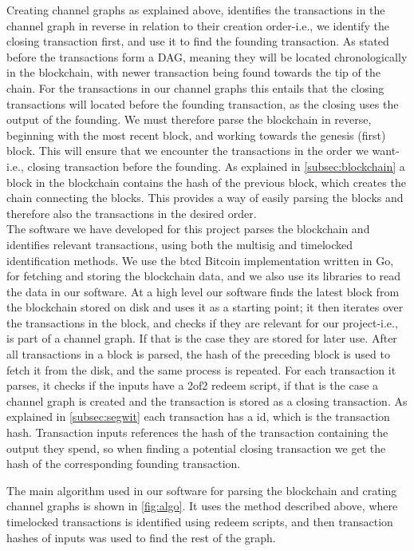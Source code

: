 Creating channel graphs as explained above, identifies the transactions in the channel graph in reverse in relation to their creation order-i.e., we identify the closing transaction first, and use it to find the founding transaction. As stated before the transactions form a DAG, meaning they will be located chronologically in the blockchain, with newer transaction being found towards the tip of the chain. For the transactions in our channel graphs this entails that the closing transactions will located before the founding transaction, as the closing uses the output of the founding.
We must therefore parse the blockchain in reverse, beginning with the most recent block, and working towards the genesis (first) block.
This will ensure that we encounter the transactions in the order we want-i.e., closing transaction before the founding.
As explained in \cref{subsec:blockchain} a block in the blockchain contains the hash of the previous block, which creates the chain connecting the blocks. This provides a way of easily parsing the blocks and therefore also the transactions in the desired order. 
\\

The software we have developed for this project parses the blockchain and identifies relevant transactions, using both the multisig and timelocked identification methods.
We use the btcd \cite{btcd_roasbeef} Bitcoin implementation written in Go, for fetching and storing the blockchain data, and we also use its libraries to read the data in our software.
At a high level our software finds the latest block from the blockchain stored on disk and uses it as a starting point;
it then iterates over the transactions in the block, and checks if they are relevant for our project-i.e., is part of a channel graph. If that is the case they are stored for later use. After all transactions in a block is parsed, the hash of the preceding block is used to fetch it from the disk, and the same process is repeated.
For each transaction it parses, it checks if the inputs have a 2of2 redeem script, if that is the case a channel graph is created and the transaction is stored as a closing transaction. As explained in \cref{subsec:segwit} each transaction has a id, which is the transaction hash. Transaction inputs references the hash of the transaction containing the output they spend, so when finding a potential closing transaction we get the hash of the corresponding founding transaction.


The main algorithm used in our software for parsing the blockchain and crating channel graphs is shown in \cref{fig:algo}. It uses the method described above, where timelocked transactions is identified using redeem scripts, and then transaction hashes of inputs was used to find the rest of the graph.


